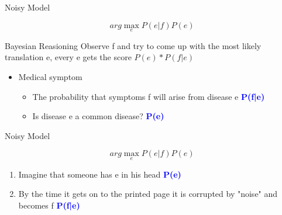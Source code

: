 \documentclass{beamer}
\begin{document}
\begin{frame}{Noisy Model}
    \begin{displaybox}{5cm}     %
    \[ arg\max_{e}{P(e|f)P(e)} \] 
     \end{displaybox} 
    \pause
    
    \begin{block}{Bayesian Reasioning}
        Observe f and try to come up with the most likely translation e, every e gets the score $P(e)*P(f|e)$
        \begin{itemize}
            \item Medical symptom
                \pause
                \begin{itemize}
                    \item The probability that symptoms f will arise from disease e \textcolor{blue}{\textbf{P(f|e)}}
                \pause
                    \item Is disease e a common disease? \textcolor{blue}{\textbf{P(e)}}
                \end{itemize}
        \end{itemize}
    \end{block}
\end{frame}

\begin{frame}{Noisy Model}
    \begin{displaybox}{5cm}     %
    \[ arg\max_{e}{P(e|f)P(e)} \] 
     \end{displaybox} 
    \pause
    \begin{enumerate}
    \item Imagine that someone has e in his head \textcolor{blue}{\textbf{P(e)}} 
    \pause
    \item By the time it gets on to the printed page it is corrupted by "noise" and becomes f \textcolor{blue}{\textbf{P(f|e)}}
    \end{enumerate}
\end{frame}
\end{document}
